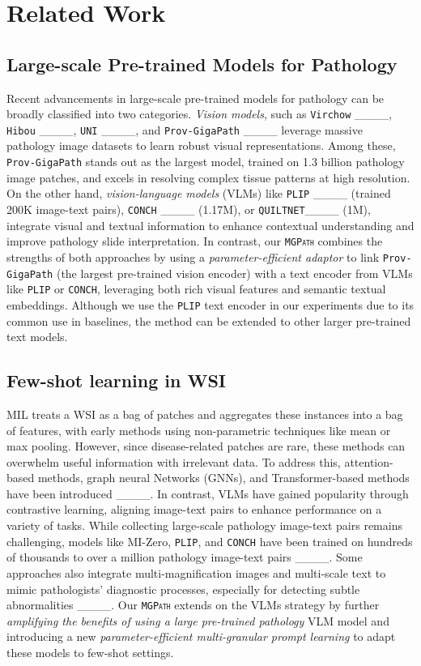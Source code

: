 \section{Related Work}
\label{section:related_work}

\subsection{Large-scale Pre-trained Models for Pathology}
Recent advancements in large-scale pre-trained models for pathology can be broadly classified into two categories. \textit{Vision models}, such as 
\texttt{Virchow} ____, 
\texttt{Hibou} ____, \texttt{UNI} ____, and \texttt{Prov-GigaPath} ____ leverage massive pathology image datasets to learn robust visual representations. Among these, \texttt{Prov-GigaPath} stands out as the largest model, trained on 1.3 billion pathology image patches, and excels in resolving complex tissue patterns at high resolution. On the other hand, \textit{vision-language models} (VLMs) like \texttt{PLIP} ____ (trained 200K image-text pairs), \texttt{CONCH} ____ (1.17M), or \texttt{QUILTNET}____ (1M), integrate visual and textual information to enhance contextual understanding and improve pathology slide interpretation. In contrast,  our \texttt{\textsc{MGPath}} combines the strengths of both approaches by using a \textit{parameter-efficient adaptor} to link \texttt{Prov-GigaPath} (the largest pre-trained vision encoder) with a text encoder from VLMs like \texttt{PLIP} or \texttt{CONCH}, leveraging both rich visual features and semantic textual embeddings. Although we use the \texttt{PLIP} text encoder in our experiments due to its common use in baselines, the method can be extended to other larger pre-trained text models.


\subsection{Few-shot learning in WSI}
MIL treats a WSI as a bag of patches and aggregates these instances into a bag of features, with early methods using non-parametric techniques like mean or max pooling. However, since disease-related patches are rare, these methods can overwhelm useful information with irrelevant data. To address this, attention-based methods, graph neural Networks (GNNs), and Transformer-based methods have been introduced ____. In contrast, VLMs have gained popularity through contrastive learning, aligning image-text pairs to enhance performance on a variety of tasks. While collecting large-scale pathology image-text pairs remains challenging, models like MI-Zero, \texttt{PLIP}, and \texttt{CONCH} have been trained on hundreds of thousands to over a million pathology image-text pairs ____.  Some approaches also integrate multi-magnification images and multi-scale text to mimic pathologists’ diagnostic processes, especially for detecting subtle abnormalities ____. Our \texttt{\textsc{MGPath}} extends on the VLMs strategy by further \textit{amplifying the benefits of using a large pre-trained pathology} VLM model and introducing a new \textit{parameter-efficient multi-granular prompt learning} to adapt these models to few-shot settings.

